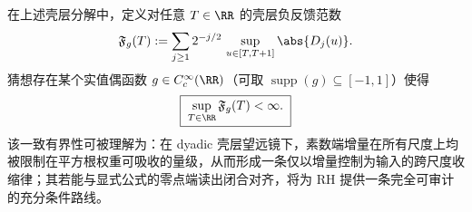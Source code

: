 \begin{conjecture}[壳层负反馈收缩准则]\label{conj:xi-prime-shell-negative-feedback}
在上述壳层分解中，定义对任意 \(T\in\RR\) 的壳层负反馈范数
\begin{equation}\label{eq:xi-prime-shell-negative-feedback-norm}
\mathfrak F_g(T):=\sum_{j\ge 1}2^{-j/2}\,\sup_{u\in[T,T+1]}\abs{D_j(u)}.
\end{equation}
猜想存在某个实值偶函数 \(g\in C_c^\infty(\RR)\)（可取 \(\operatorname{supp}(g)\subseteq[-1,1]\)）使得
\begin{equation}\label{eq:xi-prime-shell-negative-feedback-uniform-bound}
\boxed{\;
\sup_{T\in\RR}\mathfrak F_g(T)<\infty.\;}
\end{equation}
该一致有界性可被理解为：在 dyadic 壳层望远镜下，素数端增量在所有尺度上均被限制在平方根权重可吸收的量级，从而形成一条仅以增量控制为输入的跨尺度收缩律；其若能与显式公式的零点端读出闭合对齐，将为 RH 提供一条完全可审计的充分条件路线。
\end{conjecture}

\endinput
